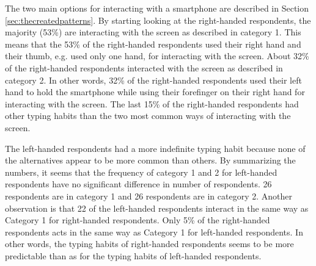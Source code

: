     The two main options for interacting with a smartphone are described in Section \ref{sec:thecreatedpatterns}. By starting looking at the right-handed respondents, the majority (53\%) are interacting with the screen as described in category 1. This means that the 53\% of the right-handed respondents used their right hand and their thumb, e.g. used only one hand, for interacting with the screen. About 32\% of the right-handed respondents interacted with the screen as described in category 2. In other words, 32\% of the right-handed respondents used their left hand to hold the smartphone while using their forefinger on their right hand for interacting with the screen. The last 15\% of the right-handed respondents had other typing habits than the two most common ways of interacting with the screen.

    The left-handed respondents had a more indefinite typing habit because none of the alternatives appear to be more common than others. By summarizing the numbers, it seems that the frequency of category 1 and 2 for left-handed respondents have no significant difference in number of respondents.  26 respondents are in category 1 and 26 respondents are in category 2. Another observation is that 22 of the left-handed respondents interact in the same way as Category 1 for right-handed respondents. Only 5\% of the right-handed respondents acts in the same way as Category 1 for left-handed respondents. In other words, the typing habits of right-handed respondents seems to be more predictable than as for the typing habits of left-handed respondents.

